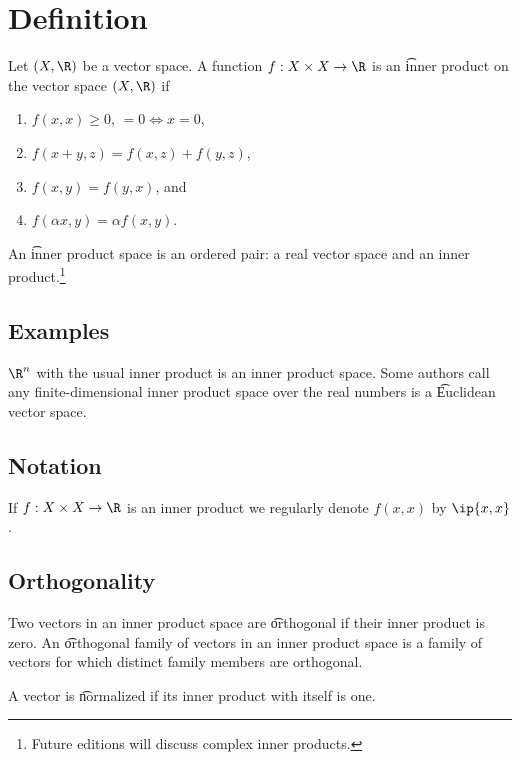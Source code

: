 
\section*{Definition}

Let $(X, \R )$ be a vector space.
A function $f: X \times  X \to \R $ is an \t{inner product} on the vector space $(X, \R )$ if
    \begin{enumerate}
      \item $f(x,x) \geq 0$, $= 0 \iff x = 0$,
      \item $f(x+y,z) = f(x,z) + f(y, z)$,
      \item $f(x,y) = f(y,x)$, and
      \item $f(\alpha  x,y) = \alpha  f(x,y)$.
    \end{enumerate}
An \t{inner product space} is an ordered pair: a real vector space and an inner product.\footnote{Future editions will discuss complex inner products.}

\subsection*{Examples}

$\R ^n$ with the usual inner product is an inner product space.
Some authors call any finite-dimensional inner product space over the real numbers is a \t{Euclidean vector space}.

\subsection*{Notation}

If $f: X \times  X \to \R $ is an inner product we regularly denote $f(x, x)$ by $\ip{x,x}$.

\subsection*{Orthogonality}

Two vectors in an inner product space are \t{orthogonal} if their inner product is zero.
An \t{orthogonal family of vectors} in an inner product space is a family of vectors for which distinct family members are orthogonal.

A vector is \t{normalized} if its inner product with itself is one.

\blankpage